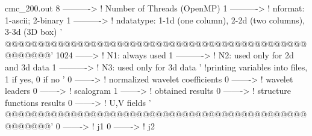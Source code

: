 cmc_200.out
8 ----------> ! Number of Threads (OpenMP)
1 ----------> ! nformat: 1-ascii; 2-binary
1 ----------> ! ndatatype: 1-1d (one column), 2-2d (two columns), 3-3d (3D box)
'    @@@@@@@@@@@@@@@@@@@@@@@@@@@@@@@@@@@@@@@@@@@@@@@@@@@@@'
1024 ------> ! N1: always used 
1 ----------> ! N2: used only for 2d and 3d data
1 ----------> ! N3: used only for 3d data
'    !printing variables into files, 1 if yes, 0 if no '
0 -------> ! normalized wavelet coefficients
0 -------> ! wavelet leaders
0 -------> ! scalogram
1 -------> ! obtained results
0 -------> ! structure functions results
0 -------> ! U,V fields
'    @@@@@@@@@@@@@@@@@@@@@@@@@@@@@@@@@@@@@@@@@@@@@@@@@@@@@'
0 -------> ! j1
0 -------> ! j2
